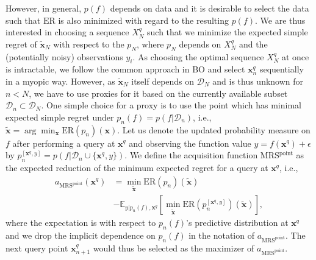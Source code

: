 \documentclass[10pt,letterpaper]{article} %
\begin{document}
However, in general, $p(f)$ depends on data and it is desirable to select the data such
that $\text{ER}$ is also minimized with regard to the resulting $p(f)$.
We are thus interested in choosing a
sequence $X^q_N$ such that we minimize the expected simple regret of $\mathbf{\tilde x}_N$ with respect to the $p_N$, where $p_N$ depends on $X^q_N$ and the (potentially noisy) observations $y_i$.
As choosing the optimal sequence $X^q_N$ at once is intractable, we follow the
common approach in BO and select $\mathbf{x}^q_n$
sequentially in a myopic way. However, as $\mathbf{\tilde x}_N$ itself depends
on $\mathcal{D}_N$ and is thus unknown for $n < N$, we have to use proxies for it based on the currently
available subset $\mathcal{D}_n \subset \mathcal{D}_N$.  One simple choice for a proxy is to use
the point which has minimal expected simple regret under $p_n(f) =
p(f \vert \mathcal{D}_n)$, i.e.,
$\mathbf{\tilde x} = \arg\min_\mathbf{x} \text{ER}(p_n)(\mathbf{x})$.
Let us denote the updated
probability measure on $f$ after performing a query at $\mathbf{x}^q$ and
observing the function value $y=f(\mathbf{x}^q) + \epsilon$ by
$p^{[\mathbf{x}^q, y]}_n = p(f\vert \mathcal{D}_n \cup \{\mathbf{x}^q, y\})$.
We define the acquisition function MRS$^{\text{point}}$ as the expected reduction of the minimum expected regret for a query at
$\mathbf{x}^q$, i.e.,
\begin{equation*}
\begin{split}
a_{\text{MRS}^{\text{point}}}(\mathbf{x}^q)
    & = \min_{\mathbf{\tilde x}}\text{ER}(p_n)(\mathbf{\tilde x}) \\
     &- \mathbb{E}_{y \vert p_n(f), \mathbf{x}^q}[\min_{\mathbf{\tilde x}}  \text{ER}(p^{[\mathbf{x}^q, y]}_n)(\mathbf{\tilde x})],
\end{split}
\end{equation*}
where the expectation is with
respect to $p_n(f)$'s predictive distribution at $\mathbf{x}^q$ and we drop the
implicit dependence on $p_n(f)$ in the notation of $a_{\text{MRS}^{\text{point}}}$.
The next query point $\mathbf{x}^q_{n+1}$ would thus be selected as the maximizer of
$a_{\text{MRS}^{\text{point}}}$.
\end{document}
